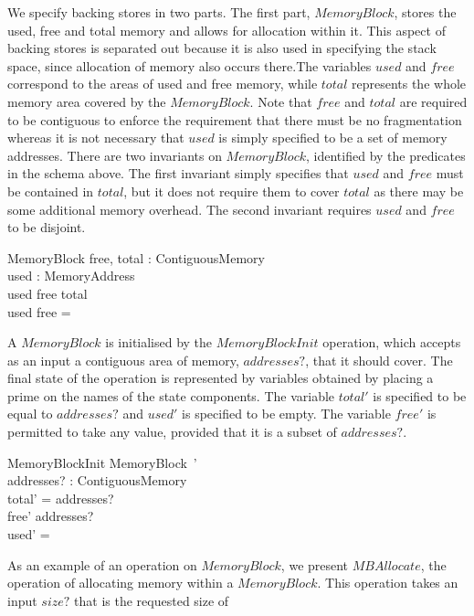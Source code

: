 \documentclass[a4paper,10pt]{report}
\begin{document}
We specify backing stores in two parts.
The first part, $MemoryBlock$, stores the used, free and total memory
and allows for allocation within it.
This aspect of backing stores is separated out because it is also used
in specifying the stack space, since allocation of memory also occurs
there.The variables $used$ and $free$ correspond to the areas of used
and free memory, while $total$ represents the whole memory area
covered by the $MemoryBlock$.
Note that $free$ and $total$ are required to be contiguous to enforce
the requirement that there must be no fragmentation whereas it is not
necessary that $used$ is simply specified to be a set of memory
addresses.
There are two invariants on $MemoryBlock$, identified by the
predicates in the schema above.
The first invariant simply specifies that $used$ and $free$ must be
contained in $total$, but it does not require them to cover $total$ as
there may be some additional memory overhead.
The second invariant requires $used$ and $free$ to be disjoint.
%
\begin{schema}{MemoryBlock}
  free, total : ContiguousMemory \\
  used : \power MemoryAddress \\
  \where
  used \cup free \subseteq total \\
  used \cap free = \emptyset \\
\end{schema}
%
A $MemoryBlock$ is initialised by the $MemoryBlockInit$ operation,
which accepts as an input a contiguous area of memory, $addresses?$,
that it should cover.
The final state of the operation is represented by variables obtained
by placing a prime on the names of the state components.
The variable $total'$ is specified to be equal to $addresses?$ and
$used'$ is specified to be empty.
The variable $free'$ is permitted to take any value, provided that it
is a subset of $addresses?$.
%
\begin{schema}{MemoryBlockInit}
  MemoryBlock~' \\
  addresses?
  : ContiguousMemory \\
  \where total' = addresses?
  \\
  free' \subseteq addresses?
  \\
  used' = \emptyset \\
\end{schema}
%
As an example of an operation on $MemoryBlock$, we present
$MBAllocate$, the operation of allocating memory within a
$MemoryBlock$.
This operation takes an input $size?$ that is the requested size of
\end{document}
